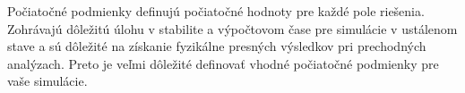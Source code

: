 \documentclass[]{tukediphc}
\begin{document}

Počiatočné podmienky definujú počiatočné hodnoty pre každé pole riešenia. Zohrávajú dôležitú úlohu v stabilite a výpočtovom čase pre simulácie v ustálenom stave a sú dôležité na získanie fyzikálne presných výsledkov pri prechodných analýzach. Preto je veľmi dôležité definovať vhodné počiatočné podmienky pre vaše simulácie.
\end{document}
